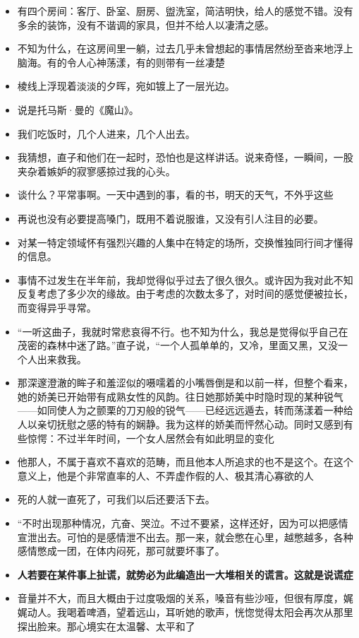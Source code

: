 \documentclass[UTF8,a4paper,8pt]{ctexart}
\begin{document}
\begin{itemize}
 	\item 有四个房间：客厅、卧室、厨房、盥洗室，简洁明快，给人的感觉不错。没有多余的装饰，没有不谐调的家具，但并不给人以凄清之感。
 	\item 不知为什么，在这房间里一躺，过去几乎未曾想起的事情居然纷至沓来地浮上脑海。有的令人心神荡漾，有的则带有一丝凄楚
 	\item 棱线上浮现着淡淡的夕晖，宛如镀上了一层光边。
 	\item 说是托马斯·曼的《魔山》。
 	\item 我们吃饭时，几个人进来，几个人出去。
 	\item 我猜想，直子和他们在一起时，恐怕也是这样讲话。说来奇怪，一瞬间，一股夹杂着嫉妒的寂寥感掠过我的心头。
 	\item 谈什么？平常事啊。一天中遇到的事，看的书，明天的天气，不外乎这些
 	\item 再说也没有必要提高嗓门，既用不着说服谁，又没有引人注目的必要。
 	\item 对某一特定领域怀有强烈兴趣的人集中在特定的场所，交换惟独同行间才懂得的信息。
 	\item 事情不过发生在半年前，我却觉得似乎过去了很久很久。或许因为我对此不知反复考虑了多少次的缘故。由于考虑的次数太多了，对时间的感觉便被拉长，而变得异乎寻常。
 	\item “一听这曲子，我就时常悲哀得不行。也不知为什么，我总是觉得似乎自己在茂密的森林中迷了路。”直子说，“一个人孤单单的，又冷，里面又黑，又没一个人出来救我。
 	\item 那深邃澄澈的眸子和羞涩似的嗫嚅着的小嘴唇倒是和以前一样，但整个看来，她的娇美已开始带有成熟女性的风韵。往日她那娇美中时隐时现的某种锐气——如同使人为之颤栗的刀刃般的锐气——已经远远遁去，转而荡漾着一种给人以亲切抚慰之感的特有的娴静。我为这样的娇美而怦然心动。同时又感到有些惊愕：不过半年时间，一个女人居然会有如此明显的变化
 	\item 他那人，不属于喜欢不喜欢的范畴，而且他本人所追求的也不是这个。在这个意义上，他是个非常直率的人、不弄虚作假的人、极其清心寡欲的人
 	\item 死的人就一直死了，可我们以后还要活下去。
 	\item “不时出现那种情况，亢奋、哭泣。不过不要紧，这样还好，因为可以把感情宣泄出去。可怕的是感情泄不出去。那一来，就会憋在心里，越憋越多，各种感情憋成一团，在体内闷死，那可就要坏事了。
 	\item \textbf{人若要在某件事上扯谎，就势必为此编造出一大堆相关的谎言。这就是说谎症}
 	\item 音量并不大，而且大概由于过度吸烟的关系，嗓音有些沙哑，但很有厚度，娓娓动人。我喝着啤酒，望着远山，耳听她的歌声，恍惚觉得太阳会再次从那里探出脸来。那心境实在太温馨、太平和了

\end{itemize}
\end{document}
